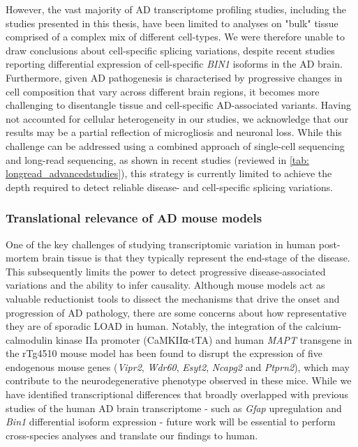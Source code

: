 However, the vast majority of AD transcriptome profiling studies, including the studies presented in this thesis, have been limited to analyses on "bulk" tissue comprised of a complex mix of different cell-types. We were therefore unable to draw conclusions about cell-specific splicing variations, despite recent studies reporting differential expression of cell-specific \textit{BIN1} isoforms in the AD brain\cite{Taga2020}. Furthermore, given AD pathogenesis is characterised by progressive changes in cell composition that vary across different brain regions, it becomes more challenging to disentangle tissue and cell-specific AD-associated variants. Having not accounted for cellular heterogeneity in our studies, we acknowledge that our results may be a partial reflection of microgliosis and neuronal loss. While this challenge can be addressed using a combined approach of single-cell sequencing and long-read sequencing, as shown in recent studies (reviewed in \cref{tab: longread_advancedstudies}), this strategy is currently limited to achieve the depth required to detect reliable disease- and cell-specific splicing variations. 

\subsubsection{Translational relevance of AD mouse models}
One of the key challenges of studying transcriptomic variation in human post-mortem brain tissue is that they typically represent the end-stage of the disease. This subsequently limits the power to detect progressive disease-associated variations and the ability to infer causality. Although mouse models act as valuable reductionist tools to dissect the mechanisms that drive the onset and progression of AD pathology, there are some concerns about how representative they are of sporadic LOAD in human. Notably, the integration of the calcium-calmodulin kinase IIa promoter (CaMKIIα-tTA) and human \textit{MAPT} transgene in the rTg4510 mouse model has been found to disrupt the expression of five endogenous mouse genes (\textit{Vipr2}, \textit{Wdr60}, \textit{Esyt2}, \textit{Ncapg2} and \textit{Ptprn2}), which may contribute to the neurodegenerative phenotype observed in these mice\cite{Castanho2020,Gamache2019}. While we have identified transcriptional differences that broadly overlapped with previous studies of the human AD brain transcriptome - such as \textit{Gfap} upregulation and \textit{Bin1} differential isoform expression - future work will be essential to perform cross-species analyses and translate our findings to human.      
	
